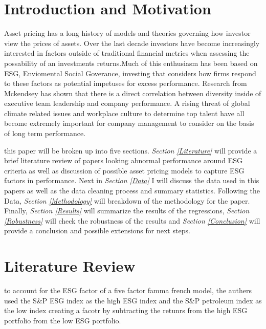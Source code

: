 \documentclass[12pt,oneside,reqno]{amsart}
\begin{document}
\section{Introduction and Motivation}
Asset pricing has a long history of models and theories governing how investor view the prices of assets. Over the last decade investors have become increasingly interested in  factors outside of traditional financial metrics when assessing the possability of an investments returns.Much of this enthusiasm has been based on ESG, Enviomental Social Goverance, investing that considers how firms respond to these factors as potential impetuses for excess performance.  Research from Mckendsey has shown that there is a direct correlation between diversity inside of executive team leadership and company performance. A rising threat of global climate related issues and workplace culture to determine top talent have all become extremely important for company management to consider on the basis of long term performance.  


this paper will be broken up into five  sections. \textit{Section \ref{Literature}} will provide a  brief literature review of papers looking abnormal performance around ESG criteria as well as discussion of possible asset pricing models to capture ESG factors in performance. Next in  \textit{ Section \ref{Data}}  I will discuss the data used in this papers as well as the data cleaning process and summary statistics. Following the Data, \textit{Section \ref{Methodology}} will breakdown of the methodology for the paper. Finally, \textit{Section \ref{Results}}  will summarize the results of the regressions, \textit{Section \ref{Robustness}} will check the robustness of the results and \textit{Section \ref{Conclusion}} will provide a conclusion and possible extensions for next steps. 

\section{Literature Review}
to account for the ESG factor of a five factor famma french model, the authers used the S\&P ESG index as the high ESG index and the S\&P petroleum index as the low index creating a facotr by subtracting the retunrs from the high ESG portfolio from the low ESG portfolio. \cite{Gregory2020TheGP}
\label{Literature}
\end{document}
